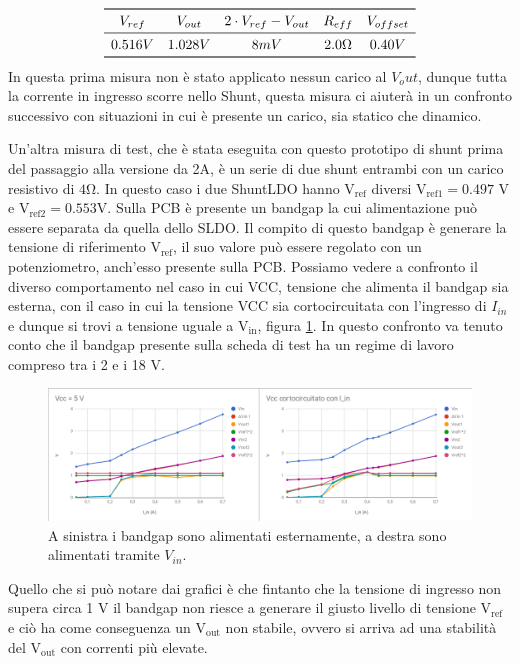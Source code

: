 \[
\begin{array}{ccccc}

\toprule
V_{ref} & V_{out} & 2 \cdot V_{ref}- V_{out} & R_{eff} & V_{offset} \\

\midrule

0.516 V & 1.028 V & 8 mV & 2.0 \Omega & 0.40 V \\

\bottomrule
\end{array}
\]
In questa prima misura non è stato applicato nessun carico al $V_out$, dunque tutta la corrente in ingresso scorre nello Shunt, questa misura ci aiuterà in un confronto successivo con situazioni in cui è presente un carico, sia statico che dinamico. 

Un'altra misura di test, che è stata eseguita con questo prototipo di shunt prima del passaggio alla versione da 2A, è un serie di due shunt entrambi con un carico resistivo di $\mathrm{4 \Omega}$. In questo caso i due ShuntLDO hanno $\mathrm{V_{ref}}$ diversi $\mathrm{V_{ref1}=0.497}$ V e $\mathrm{V_{ref2}=0.553 V}$. 
Sulla PCB è presente un bandgap la cui alimentazione può essere separata da quella dello SLDO. Il compito di questo bandgap è generare la tensione di riferimento $\mathrm{V_{ref}}$, il suo valore può essere regolato con un potenziometro, anch'esso presente sulla PCB.
Possiamo vedere a confronto il diverso comportamento nel caso in cui VCC, tensione che alimenta il bandgap sia esterna, con il caso in cui la tensione VCC sia cortocircuitata con l'ingresso di $I_{in}$ e dunque si trovi a tensione uguale a $\mathrm{V_{in}}$, figura \ref{SLDO5Serie}. In questo confronto va tenuto conto che il bandgap presente sulla scheda di test ha un regime di lavoro compreso tra  i 2 e i 18 V. 
\begin{figure}
\centering
\includegraphics[scale=.3]{Immagini/SLDO5Serie}
\caption{A sinistra i bandgap sono alimentati esternamente, a destra sono alimentati tramite $V_{in}$.}
\label{SLDO5Serie}
\end{figure}
Quello che si può notare dai grafici è che fintanto che la tensione di ingresso non supera circa 1 V il bandgap non riesce a generare il giusto livello di tensione $\mathrm{V_{ref}}$ e ciò ha come conseguenza un $\mathrm{V_{out}}$ non stabile, ovvero si arriva ad una stabilità del $\mathrm{V_{out}}$ con correnti più elevate.


